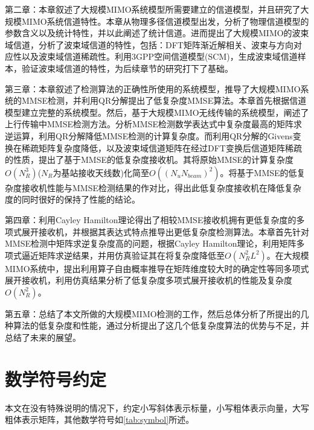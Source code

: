 \documentclass[bachelor,nocolorlinks, printoneside]{seuthesis} %
\begin{document}
\begin{Main}
第二章：本章叙述了大规模MIMO系统模型所需要建立的信道模型，并且研究了大规模MIMO系统信道特性。本章从物理多径信道模型出发，分析了物理信道模型的参数含义以及统计特性，并以此阐述了统计信道。进而提出了大规模MIMO的波束域信道，分析了波束域信道的特性，包括：DFT矩阵渐近解相关、波束与方向对应性以及波束域信道稀疏性。利用3GPP空间信道模型(SCM)，生成波束域信道样本，验证波束域信道的特性，为后续章节的研究打下了基础。

第三章：本章叙述了检测算法的正确性所使用的系统模型，推导了大规模MIMO系统的MMSE检测，并利用QR分解提出了低复杂度MMSE算法。本章首先根据信道模型建立完整的系统模型。然后，基于大规模MIMO无线传输的系统模型，阐述了上行传输中MMSE检测方法。分析MMSE检测数学表达式中复杂度最高的矩阵求逆运算，利用QR分解降低MMSE检测的计算复杂度。而利用QR分解的Givens变换在稀疏矩阵复杂度降低，以及波束域信道矩阵在经过DFT变换后信道矩阵稀疏的性质，提出了基于MMSE的低复杂度接收机。其将原始MMSE的计算复杂度$O(N_R^3)$($N_R$为基站接收天线数)化简至$O((N_uN_{beam})^2)$。将基于MMSE的低复杂度接收机性能与MMSE检测结果的作对比，得出此低复杂度接收机在降低复杂度的同时很好的保持了性能的结论。

第四章：利用Cayley Hamilton理论得出了相较MMSE接收机拥有更低复杂度的多项式展开接收机，并根据其表达式特点推导出更低复杂度检测算法。本章首先针对MMSE检测中矩阵求逆复杂度高的问题，根据Cayley Hamilton理论，利用矩阵多项式逼近矩阵求逆结果，并用仿真验证其在将复杂度降低至$O(N_R^2L^2)$。在大规模MIMO系统中，提出利用算子自由概率推导在矩阵维度较大时的确定性等同多项式展开接收机，利用仿真结果分析了低复杂度多项式展开接收机的性能及复杂度$O(N_R^2)$。

第五章：总结了本文所做的大规模MIMO检测的工作，然后总体分析了所提出的几种算法的低复杂度和性能，通过分析提出了这几个低复杂度算法的优势与不足，并总结了未来的展望。

\section{数学符号约定}
本文在没有特殊说明的情况下，约定小写斜体表示标量，小写粗体表示向量，大写粗体表示矩阵，其他数学符号如\ref{tab:symbol}所述。


\end{Main}
\end{document}
